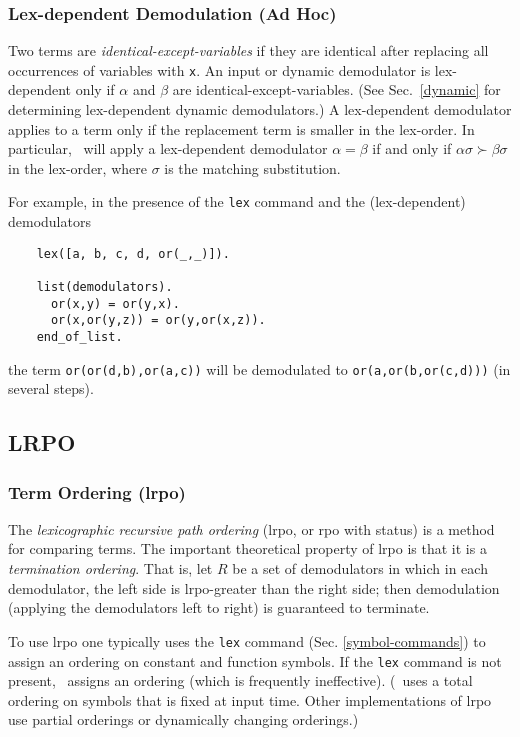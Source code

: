 \documentclass[11pt]{article}
\begin{document}
\subsubsection{Lex-dependent Demodulation (Ad Hoc)} \label{lex-dep}

Two terms are {\it identical-except-variables} if they are identical
after replacing all occurrences of variables with \verb:x:.
An input or dynamic demodulator is lex-dependent only if
$\alpha$ and $\beta$ are identical-except-variables.
(See Sec.~\ref{dynamic} for determining lex-dependent dynamic demodulators.)
A lex-dependent demodulator applies to a term only if
the replacement term is smaller in the lex-order.
In particular, \otter\ will apply a lex-dependent demodulator
$\alpha=\beta$ if and only if $\alpha\sigma\succ\beta\sigma$ in the
lex-order, where $\sigma$ is the matching substitution.

For example, in the presence of the \verb:lex: command and the
(lex-dependent) demodulators

{\small
\begin{verbatim}
    lex([a, b, c, d, or(_,_)]).

    list(demodulators).
      or(x,y) = or(y,x).
      or(x,or(y,z)) = or(y,or(x,z)).
    end_of_list.
\end{verbatim}
}
\noindent
the term \verb:or(or(d,b),or(a,c)): will be demodulated to
\verb:or(a,or(b,or(c,d))): (in several steps).

\subsection{LRPO} \label{lrpo}

\subsubsection{Term Ordering ({\sc lrpo})}

The {\em lexicographic recursive path ordering} ({\sc lrpo}, or
{\sc rpo} with status) \cite{termination,rta-85,rrl} is a method for
comparing terms.  The important theoretical property of {\sc lrpo} is
that it is a {\em termination ordering}.  That is, let $R$ be a set of
demodulators in which in each demodulator, the left side is
{\sc lrpo}-greater than the right side; then demodulation (applying the
demodulators left to right) is guaranteed to terminate.

To use {\sc lrpo} one typically uses the \verb:lex: command (Sec.
\ref{symbol-commands}) to assign an ordering on constant and function symbols.
If the \verb:lex: command is not present, \otter\ assigns an ordering
(which is frequently ineffective).
(\otter\ uses a total ordering on symbols that is fixed at input time.
Other implementations of {\sc lrpo} use partial orderings or dynamically
changing orderings.)
\end{document}
